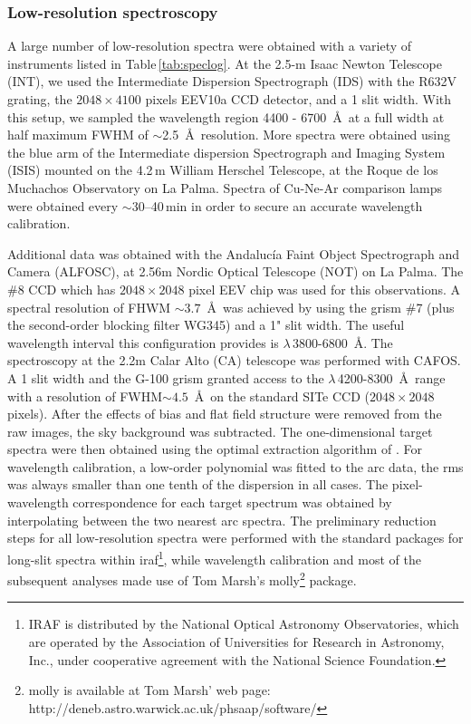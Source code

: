 \documentclass[fleqn,usenatbib]{mnras}
\begin{document}
\subsubsection{Low-resolution spectroscopy}

A large number of low-resolution spectra were obtained with a variety of instruments listed in Table\,\ref{tab:speclog}. 
At the 2.5-m Isaac Newton Telescope (INT), we used the Intermediate Dispersion Spectrograph (IDS) with the R632V grating, 
the $2048\times 4100$ pixels EEV10a CCD detector, and a 1 slit width. With this setup, we sampled the wavelength region 4400 - 6700~\AA\
at a  full width at half maximum FWHM of $\sim$2.5~\AA\ resolution.  
More spectra were obtained using the blue arm of the Intermediate dispersion Spectrograph and Imaging System (ISIS) mounted on the 4.2\,m
William Herschel Telescope, at the Roque de los Muchachos Observatory on La Palma. Spectra of Cu-Ne-Ar comparison lamps were obtained every
$\sim$30--40\,min in order to secure an accurate wavelength calibration. %

Additional data was obtained with the Andaluc\'ia Faint Object Spectrograph and Camera (ALFOSC), at 2.56m Nordic Optical Telescope (NOT) on La Palma. The $\#$8 CCD which has $2048\times2048$ pixel EEV chip was used for this observations. A spectral resolution of  FHWM $\sim 3.7$~\AA\  was achieved by using the grism $\#$7 (plus the second-order blocking filter WG345) and a 1" slit width. The useful wavelength interval this configuration provides is $\lambda$\,3800-6800~\AA.  The spectroscopy at the 2.2m Calar Alto  (CA) telescope was performed with CAFOS. A 1 slit width and the G-100 grism granted access to the $\lambda$\,4200-8300~\AA\ range with a resolution of FWHM$\sim 4.5$~\AA\  on the standard SITe CCD ($2048\times2048$ pixels). 
After the effects of bias and flat field structure were removed from the raw images, the sky background was subtracted. The one-dimensional
target spectra were then obtained using the optimal extraction algorithm of \citet{Horne86}. For wavelength calibration, a low-order
polynomial was fitted to the arc data, the rms was always smaller than one tenth of the dispersion in all cases. The pixel-wavelength
correspondence for each target spectrum was obtained by interpolating between the two nearest arc spectra. The preliminary reduction steps  for all low-resolution spectra were performed with the standard packages for long-slit spectra within {\sc iraf}\footnote{IRAF is
distributed by the National Optical Astronomy Observatories, which
are operated by the Association of Universities for Research in Astronomy, Inc., under cooperative agreement with the National Science
Foundation.}, while wavelength calibration and most of the subsequent analyses made use of Tom Marsh’s {\sc molly}\footnote{{\sc molly} is
available at Tom Marsh’ web page: http://deneb.astro.warwick.ac.uk/phsaap/software/} package.
\end{document}

